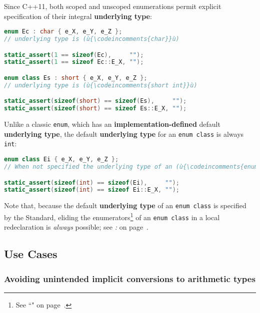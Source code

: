 Since C++11, both scoped and unscoped enumerations permit explicit
specification of their integral \textbf{underlying type}:

\begin{lstlisting}[language=C++]
enum Ec : char { e_X, e_Y, e_Z };
// underlying type is (ù{\codeincomments{char}}ù)

static_assert(1 == sizeof(Ec),     "");
static_assert(1 == sizeof Ec::E_X, "");

enum class Es : short { e_X, e_Y, e_Z };
// underlying type is (ù{\codeincomments{short int}}ù)

static_assert(sizeof(short) == sizeof(Es),     "");
static_assert(sizeof(short) == sizeof Es::E_X, "");
\end{lstlisting}

\noindent Unlike a classic \texttt{enum}, which has an
\textbf{implementation-defined} default \textbf{underlying type}, the
default \textbf{underlying type} for an \texttt{enum}~\texttt{class} is
always \texttt{int}:

\begin{lstlisting}[language=C++]
enum class Ei { e_X, e_Y, e_Z };
// When not specified the underlying type of an (ù{\codeincomments{enum class}}ù) is (ù{\codeincomments{int}}ù).

static_assert(sizeof(int) == sizeof(Ei),     "");
static_assert(sizeof(int) == sizeof Ei::E_X, "");
\end{lstlisting}

\noindent Note that, because the default \textbf{underlying type} of an
\texttt{enum}~\texttt{class} is specified by the Standard, eliding the
enumerators\footnote{See ``" on page~\pageref{enumopaque}.} of an \texttt{enum}~\texttt{class} in
a local redeclaration is \emph{always} possible; see
\textit{: } on page~\pageref{external-use-of-opaque-enumerators}.

\subsection[Use Cases]{Use Cases}\label{use-cases-enumclass}

\subsubsection[Avoiding unintended implicit conversions to arithmetic types]{Avoiding unintended implicit conversions to arithmetic types}\label{avoiding-unintended-implicit-conversions-to-arithmetic-types}

